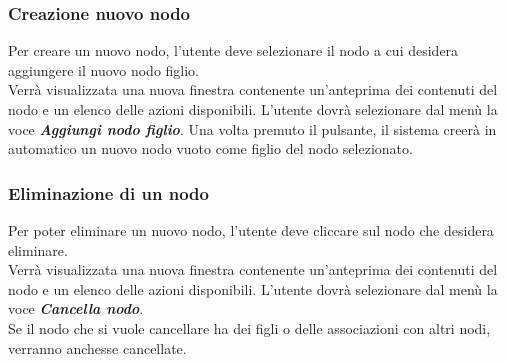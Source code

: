 \subsubsection{Creazione nuovo nodo}
Per creare un nuovo nodo, l'utente deve selezionare il nodo a cui desidera aggiungere il nuovo nodo figlio.\\
Verrà visualizzata una nuova finestra contenente un'anteprima dei contenuti del nodo e un elenco delle azioni disponibili. L'utente dovrà selezionare dal menù la voce \textbf{\textit{Aggiungi nodo figlio}}. Una volta premuto il pulsante, il sistema creerà in automatico un nuovo nodo vuoto come figlio del nodo selezionato.
\subsubsection{Eliminazione di un nodo}
Per poter eliminare un nuovo nodo, l'utente deve cliccare sul nodo che desidera eliminare.\\
Verrà visualizzata una nuova finestra contenente un'anteprima dei contenuti del nodo e un elenco delle azioni disponibili. L'utente dovrà selezionare dal menù la voce \textbf{\textit{Cancella nodo}}.\\
Se il nodo che si vuole cancellare ha dei figli o delle associazioni con altri nodi, verranno anchesse cancellate.\\
